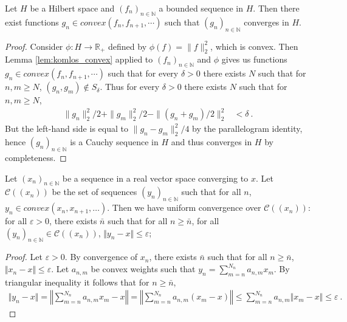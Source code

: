 \begin{lemma}\label{lem:komlos_norm}
  \leanok
Let $H$ be a Hilbert space and $(f_n)_{n\in\mathbb{N}}$ a bounded sequence in $H$. Then there exist functions $g_n\in convex(f_n,f_{n+1},\cdots)$ such that $(g_n)_{n\in\mathbb{N}}$ converges in $H$.
\end{lemma}

\begin{proof}
  \leanok
Consider $\phi : H \to \mathbb{R}_+$ defined by $\phi(f) = \|f\|_2^2$, which is convex.
Then Lemma \ref{lem:komlos_convex} applied to $(f_n)_{n\in\mathbb{N}}$ and $\phi$ gives us functions $g_n\in convex(f_n,f_{n+1},\cdots)$ such that for every $\delta>0$ there exists $N$ such that for $n,m\geq N$, $(g_n,g_m)\notin S_\delta$.
Thus for every $\delta>0$ there exists $N$ such that for $n,m\geq N$,
\begin{align*}
  \|g_n\|_2^2/2 + \|g_m\|_2^2/2 - \|(g_n+g_m)/2\|_2^2
  &< \delta
  \: .
\end{align*}
But the left-hand side is equal to $\|g_n - g_m\|_2^2/4$ by the parallelogram identity, hence $(g_n)_{n\in\mathbb{N}}$ is a Cauchy sequence in $H$ and thus converges in $H$ by completeness.
\end{proof}


\begin{lemma}\label{lem:convex_of_converg_seq_is_converg}\leanok
  Let $(x_n)_{n \in \mathbb{N}}$ be a sequence in a real vector space converging to $x$.
  Let $\mathcal{C}((x_n))$ be the set of sequences $(y_n)_{n \in \mathbb{N}}$ such that for all $n$, $y_n \in convex(x_n, x_{n+1}, \ldots)$.
  Then we have uniform convergence over $\mathcal{C}((x_n))$: for all $\varepsilon > 0$, there exists $\bar{n}$ such that for all $n \ge \bar{n}$, for all $(y_n)_{n \in \mathbb{N}} \in \mathcal{C}((x_n))$, $\Vert y_n - x \Vert \le \varepsilon$;
\end{lemma}

\begin{proof} \leanok
Let $\varepsilon>0$.
By convergence of $x_n$, there exists $\bar{n}$ such that for all $n \ge \bar{n}$, $\Vert x_n-x \Vert \le \varepsilon$.
Let $a_{n, m}$ be convex weights such that $y_n = \sum_{m = n}^{N_n} a_{n, m} x_m$.
By triangular inequality it follows that for $n \ge \bar{n}$,
\begin{align*}
  \Vert y_n - x \Vert
  = \left\Vert \sum_{m = n}^{N_n} a_{n, m} x_m - x \right\Vert
  = \left\Vert \sum_{m = n}^{N_n} a_{n, m} (x_m - x) \right\Vert
  \le \sum_{m = n}^{N_n} a_{n, m} \Vert x_m - x \Vert
  \le \varepsilon
  \: .
\end{align*}
\end{proof}

